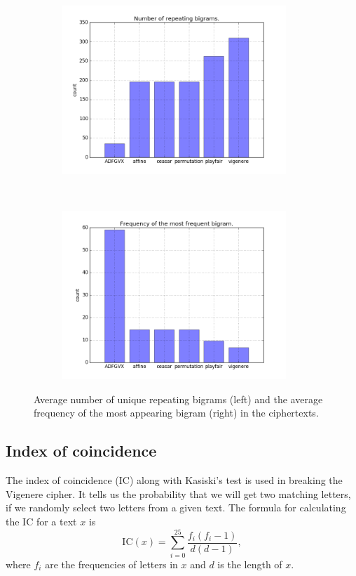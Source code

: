 \documentclass[a4paper]{article}
\begin{document}
\begin{figure}[H]
    \centering
    \begin{subfigure}[h]{0.5\textwidth}
    		\centering
        \includegraphics[height=2.5in]{img/bigrams_1.png}
    \end{subfigure}%
    ~
    \begin{subfigure}[h]{0.5\textwidth}
	    \centering
        \includegraphics[height=2.5in]{img/bigrams_2.png}
    \end{subfigure}
    \caption{Average number of unique repeating bigrams (left) and the average frequency of the most appearing bigram (right) in the ciphertexts.}
    \label{fig:bigrams}
\end{figure}

\subsection{Index of coincidence}
The index of coincidence (IC) along with Kasiski's test is used in breaking the Vigenere cipher. It tells us the probability that we will get two matching letters, if we randomly select two letters from a given text. The formula for calculating the IC for a text $x$ is
$$\mbox{IC}(x) = \sum_{i=0}^{25} \frac{f_{i}(f_{i}-1)}{d(d-1)}, $$
where $f_{i}$ are the frequencies of letters in $x$ and $d$ is the length of $x$.
\end{document}
